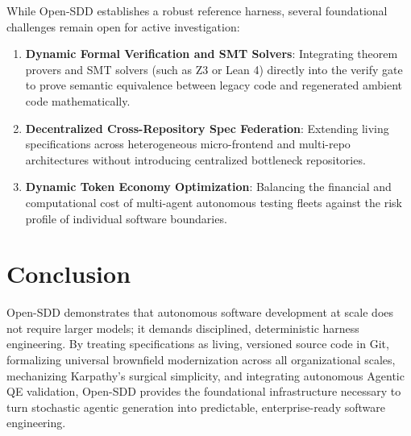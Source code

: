 \documentclass[11pt,a4paper]{article}
\begin{document}
While Open-SDD establishes a robust reference harness, several foundational challenges remain open for active investigation:
\begin{enumerate}
    \item \textbf{Dynamic Formal Verification and SMT Solvers}: Integrating theorem provers and SMT solvers (such as Z3 or Lean 4) directly into the verify gate to prove semantic equivalence between legacy code and regenerated ambient code mathematically.
    \item \textbf{Decentralized Cross-Repository Spec Federation}: Extending living specifications across heterogeneous micro-frontend and multi-repo architectures without introducing centralized bottleneck repositories.
    \item \textbf{Dynamic Token Economy Optimization}: Balancing the financial and computational cost of multi-agent autonomous testing fleets against the risk profile of individual software boundaries.
\end{enumerate}

\section{Conclusion}

Open-SDD demonstrates that autonomous software development at scale does not require larger models; it demands disciplined, deterministic harness engineering. By treating specifications as living, versioned source code in Git, formalizing universal brownfield modernization across all organizational scales, mechanizing Karpathy's surgical simplicity, and integrating autonomous Agentic QE validation, Open-SDD provides the foundational infrastructure necessary to turn stochastic agentic generation into predictable, enterprise-ready software engineering.
\end{document}
